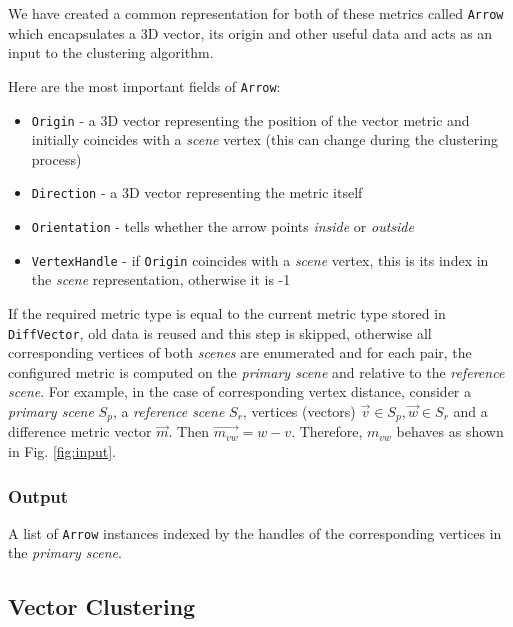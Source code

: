 We have created a common representation for both of these metrics called \verb+Arrow+ which encapsulates a 3D vector, its origin and other useful data and acts as an input to the clustering algorithm.

Here are the most important fields of \verb+Arrow+:

\begin{itemize}
\item \verb+Origin+ - a 3D vector representing the position of the vector metric and initially coincides with a {\it scene} vertex (this can change during the clustering process)
\item \verb+Direction+ - a 3D vector representing the metric itself
\item \verb+Orientation+ - tells whether the arrow points {\it inside} or {\it outside}
\item \verb+VertexHandle+ - if \verb+Origin+ coincides with a {\it scene} vertex, this is its index in the {\it scene} representation, otherwise it is -1
\end{itemize}

If the required metric type is equal to the current metric type stored in \verb+DiffVector+, old data is reused and this step is skipped, otherwise all corresponding vertices of both {\it scenes} are enumerated and for each pair, the configured metric is computed on the {\it primary scene} and relative to the {\it reference scene}. For example, in the case of corresponding vertex distance, consider a {\it primary scene} \(S_p\), a {\it reference scene} \(S_r\), vertices (vectors) \(\overrightarrow{v} \in S_p, \overrightarrow{w} \in S_r\) and a difference metric vector \(\overrightarrow{m}\). Then \(\overrightarrow{m_{vw}} = w - v\). Therefore, \(m_{vw}\) behaves as shown in Fig. \ref{fig:input}.

\subsubsection{Output}

A list of \verb+Arrow+ instances indexed by the handles of the corresponding vertices in the {\it primary scene}.

\subsection{Vector Clustering}
\label{sec:implementation_clustering}

